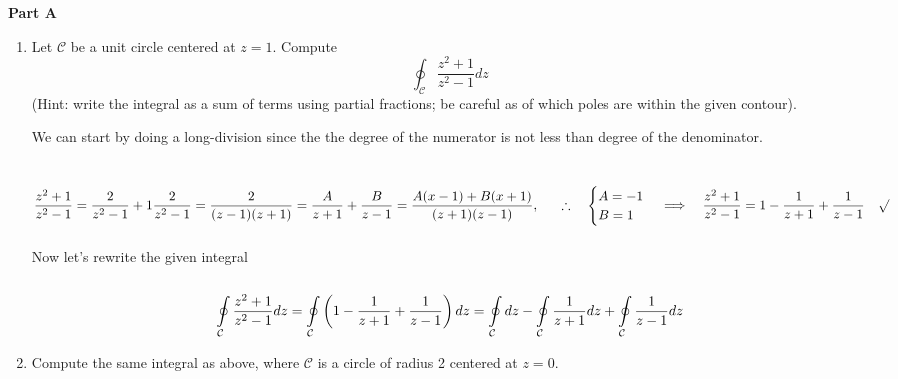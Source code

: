 \documentclass[fleqn]{article}
\begin{document}
  \textbf{Part A}
  \begin{enumerate}
    \item Let ${\mathcal C}$ be a unit circle centered at $z = 1$. Compute
      $$
      \oint_{\mathcal C}   \frac{z^2 + 1}{z^2 - 1} dz
      $$
      (Hint: write the integral as a sum of terms using partial fractions; be careful as of which poles are within the given contour). 

        \textcolor{hwColor}{
          We can start by doing a long-division since the the degree of the numerator is not 
          less than degree of the denominator.\\
          \\
          \\
          $
            \dfrac{z^2+1}{z^2-1}=\dfrac{2}{z^2-1}+1 \\
            \\
            \\
            \dfrac{2}{z^2-1}=\dfrac{2}{(z-1)(z+1)}=\dfrac{A}{z+1}+\dfrac{B}{z-1}=\dfrac{A(x-1)+B(x+1)}{(z+1)(z-1)},
            ~~~~~ \therefore ~~~ \begin{cases}
              A=-1 \\
              B=1
            \end{cases} \\
            \\
            \\
            \Longrightarrow ~~~ \dfrac{z^2+1}{z^2-1}=1-\dfrac{1}{z+1}+\dfrac{1}{z-1} ~~~ \surd \\
          $
          \\
          \\
          Now let's rewrite the given integral
          \\
          \\
          $$
            \oint\limits_{\mathcal C}   \frac{z^2 + 1}{z^2 - 1} dz \\ \\
            =\oint\limits_{\mathcal C}  \left(1-\dfrac{1}{z+1}+\dfrac{1}{z-1}\right) dz \\ \\
            =\oint\limits_{\mathcal C} dz-\oint\limits_{\mathcal C} \dfrac{1}{z+1}dz+\oint\limits_{\mathcal C}\dfrac{1}{z-1}dz
          $$
        }

      \item Compute the same integral as above, where ${\mathcal C}$ is a circle of radius 2 centered at $z = 0$.


\end{enumerate}
\end{document}
